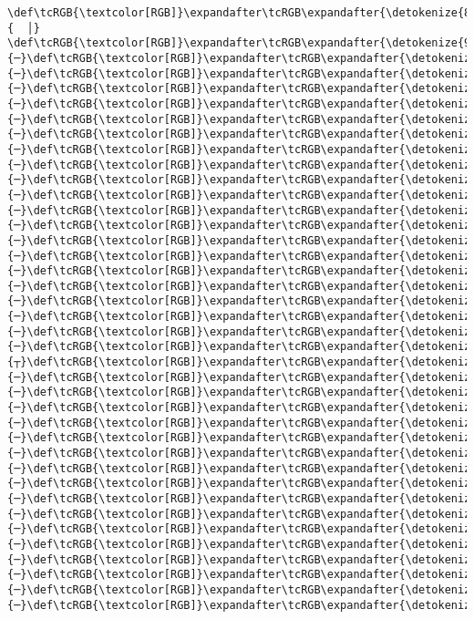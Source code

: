 \documentclass[11pt]{article}
\begin{document}
\begin{Verbatim}[commandchars=\\\{\}, frame=single, framerule=2mm, rulecolor=\color{outerrorbackground}]
 \def\tcRGB{\textcolor[RGB]}\expandafter\tcRGB\expandafter{\detokenize{88,88,88}}{  │}     \def\tcRGB{\textcolor[RGB]}\expandafter\tcRGB\expandafter{\detokenize{95,0,135}}{─}\def\tcRGB{\textcolor[RGB]}\expandafter\tcRGB\expandafter{\detokenize{95,0,135}}{─}\def\tcRGB{\textcolor[RGB]}\expandafter\tcRGB\expandafter{\detokenize{95,0,135}}{─}\def\tcRGB{\textcolor[RGB]}\expandafter\tcRGB\expandafter{\detokenize{95,0,135}}{─}\def\tcRGB{\textcolor[RGB]}\expandafter\tcRGB\expandafter{\detokenize{95,0,135}}{─}\def\tcRGB{\textcolor[RGB]}\expandafter\tcRGB\expandafter{\detokenize{95,0,135}}{─}\def\tcRGB{\textcolor[RGB]}\expandafter\tcRGB\expandafter{\detokenize{95,0,135}}{─}\def\tcRGB{\textcolor[RGB]}\expandafter\tcRGB\expandafter{\detokenize{95,0,135}}{─}\def\tcRGB{\textcolor[RGB]}\expandafter\tcRGB\expandafter{\detokenize{95,0,135}}{─}\def\tcRGB{\textcolor[RGB]}\expandafter\tcRGB\expandafter{\detokenize{95,0,135}}{─}\def\tcRGB{\textcolor[RGB]}\expandafter\tcRGB\expandafter{\detokenize{95,0,135}}{─}\def\tcRGB{\textcolor[RGB]}\expandafter\tcRGB\expandafter{\detokenize{95,0,135}}{─}\def\tcRGB{\textcolor[RGB]}\expandafter\tcRGB\expandafter{\detokenize{95,0,135}}{─}\def\tcRGB{\textcolor[RGB]}\expandafter\tcRGB\expandafter{\detokenize{95,0,135}}{─}\def\tcRGB{\textcolor[RGB]}\expandafter\tcRGB\expandafter{\detokenize{95,0,135}}{─}\def\tcRGB{\textcolor[RGB]}\expandafter\tcRGB\expandafter{\detokenize{95,0,135}}{─}\def\tcRGB{\textcolor[RGB]}\expandafter\tcRGB\expandafter{\detokenize{95,0,135}}{─}\def\tcRGB{\textcolor[RGB]}\expandafter\tcRGB\expandafter{\detokenize{95,0,135}}{─}\def\tcRGB{\textcolor[RGB]}\expandafter\tcRGB\expandafter{\detokenize{95,0,135}}{─}\def\tcRGB{\textcolor[RGB]}\expandafter\tcRGB\expandafter{\detokenize{95,0,135}}{─}\def\tcRGB{\textcolor[RGB]}\expandafter\tcRGB\expandafter{\detokenize{95,0,135}}{┬}\def\tcRGB{\textcolor[RGB]}\expandafter\tcRGB\expandafter{\detokenize{95,0,135}}{─}\def\tcRGB{\textcolor[RGB]}\expandafter\tcRGB\expandafter{\detokenize{95,0,135}}{─}\def\tcRGB{\textcolor[RGB]}\expandafter\tcRGB\expandafter{\detokenize{95,0,135}}{─}\def\tcRGB{\textcolor[RGB]}\expandafter\tcRGB\expandafter{\detokenize{95,0,135}}{─}\def\tcRGB{\textcolor[RGB]}\expandafter\tcRGB\expandafter{\detokenize{95,0,135}}{─}\def\tcRGB{\textcolor[RGB]}\expandafter\tcRGB\expandafter{\detokenize{95,0,135}}{─}\def\tcRGB{\textcolor[RGB]}\expandafter\tcRGB\expandafter{\detokenize{95,0,135}}{─}\def\tcRGB{\textcolor[RGB]}\expandafter\tcRGB\expandafter{\detokenize{95,0,135}}{─}\def\tcRGB{\textcolor[RGB]}\expandafter\tcRGB\expandafter{\detokenize{95,0,135}}{─}\def\tcRGB{\textcolor[RGB]}\expandafter\tcRGB\expandafter{\detokenize{95,0,135}}{─}\def\tcRGB{\textcolor[RGB]}\expandafter\tcRGB\expandafter{\detokenize{95,0,135}}{─}\def\tcRGB{\textcolor[RGB]}\expandafter\tcRGB\expandafter{\detokenize{95,0,135}}{─}\def\tcRGB{\textcolor[RGB]}\expandafter\tcRGB\expandafter{\detokenize{95,0,135}}{─}\def\tcRGB{\textcolor[RGB]}\expandafter\tcRGB\expandafter{\detokenize{95,0,135}}{─}\def\tcRGB{\textcolor[RGB]}\expandafter\tcRGB\expandafter{\detokenize{95,0,135}}{─}\def\tcRGB{\textcolor[RGB]}\expandafter\tcRGB\expandafter{\detokenize{95,0,135}}{─}\def\tcRGB{\textcolor[RGB]}\expandafter\tcRGB\expandafter{\detokenize
\end{Verbatim}
\end{document}
